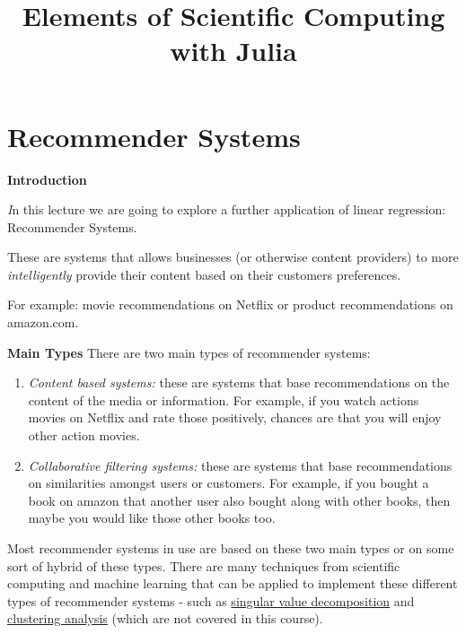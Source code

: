 \documentclass[xcolor=dvipsnames]{beamer}
\title[Scientific Computing]{Elements of Scientific Computing with Julia}
\begin{document}
\begin{frame}
\titlepage
\end{frame}

\section{Recommender Systems}
\begin{frame}
{\bf Introduction}

{\it\huge I}n this lecture we are going to explore a further application of linear regression: Recommender Systems. \vfill
\pause

These are systems that allows businesses (or otherwise content providers) to more \emph{intelligently} provide their content based on their customers preferences.  \vfill

\pause 
For example: movie recommendations on Netflix or product recommendations on amazon.com.\\
\end{frame}

\begin{frame}
{\bf Main Types}
There are two main types of recommender systems:
\begin{enumerate}
\pause
\item \emph{Content based systems: }these are systems that base recommendations on the content of the media or information. For example, if you watch actions movies on Netflix and rate those positively, chances are that you will enjoy other action movies.
\pause
\item \emph{Collaborative filtering systems: }these are systems that base recommendations on similarities amongst users or customers. For example, if you bought a book on amazon that another user also bought along with other books, then maybe you would like those other books too.\\
\end{enumerate}
\end{frame}

\begin{frame}
Most recommender systems in use are based on these two main types or on some sort of hybrid of these types. \vfill\pause There are many techniques from scientific computing and machine learning that can be applied to implement these different types of recommender systems - such as \href{https://en.wikipedia.org/wiki/Singular_value_decomposition}{singular value decomposition} and \href{https://en.wikipedia.org/wiki/Cluster_analysis}{clustering analysis} (which are not covered in this course). \\
\end{frame}
\end{document}
